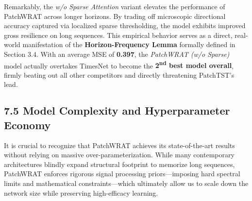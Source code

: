 \documentclass[11pt, letterpaper]{article}
\begin{document}
Remarkably, the \textit{w/o Sparse Attention} variant elevates the performance of PatchWRAT across longer horizons. By trading off microscopic directional accuracy captured via localized sparse thresholding, the model exhibits improved gross resilience on long sequences. This empirical behavior serves as a direct, real-world manifestation of the \textbf{Horizon-Frequency Lemma} formally defined in Section 3.4. With an average MSE of \textbf{0.397}, the \textit{PatchWRAT (w/o Sparse)} model actually overtakes TimesNet to become the \textbf{2\textsuperscript{nd} best model overall}, firmly beating out all other competitors and directly threatening PatchTST's lead.

\subsection{7.5 Model Complexity and Hyperparameter Economy}
It is crucial to recognize that PatchWRAT achieves its state-of-the-art results without relying on massive over-parameterization. While many contemporary architectures blindly expand structural footprint to memorize long sequences, PatchWRAT enforces rigorous signal processing priors—imposing hard spectral limits and mathematical constraints—which ultimately allow us to scale down the network size while preserving high-efficacy learning.
\end{document}
